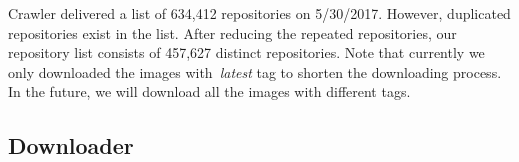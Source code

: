 Crawler delivered a list of 634,412 repositories on 5/30/2017.
%
However, duplicated repositories exist in the list.
%
After reducing the repeated repositories, our repository list consists of 457,627 distinct repositories. 
%
Note that currently we only downloaded the images with~\textit{latest} tag to shorten the downloading process. 
%
In the future, we will download all the images with different tags.
%
%
%
%
%
%
%
\subsection{Downloader}

